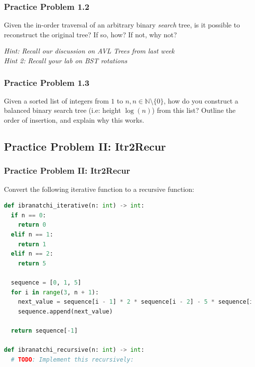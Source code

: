 \documentclass[hyperref={colorlinks,citecolor=blue,linkcolor=blue,urlcolor=blue}, aspectratio=1610]{beamer}
\begin{document}
\begin{frame}
  \frametitle{Practice Problem 1.2}
  Given the in-order traversal of an arbitrary binary \textit{search} tree, is it possible to reconstruct the original tree? If so, how? If not, why not?
  
  \textit{Hint: Recall our discussion on AVL Trees from last week}\\
  \textit{Hint 2: Recall your lab on BST rotations}

\end{frame}

\begin{frame}[fragile]
  \frametitle{Practice Problem 1.3}
  Given a sorted list of integers from $1$ to $n, n \in \mathbb{N} \setminus \{0\}$, how do you construct a balanced binary search tree (i.e: height $\log(n)$) from this list? Outline the order of insertion, and explain why this works.\\

\end{frame}

\subsection{Practice Problem II: Itr2Recur}
\begin{frame}[fragile]
  \frametitle{Practice Problem II: Itr2Recur}
  Convert the following iterative function to a recursive function:

  \begin{lstlisting}[language=Python, style=mystyle]
def ibranatchi_iterative(n: int) -> int:
  if n == 0:
    return 0
  elif n == 1:
    return 1
  elif n == 2:
    return 5

  sequence = [0, 1, 5]
  for i in range(3, n + 1):
    next_value = sequence[i - 1] * 2 * sequence[i - 2] - 5 * sequence[i - 3]
    sequence.append(next_value)

  return sequence[-1]
 
def ibranatchi_recursive(n: int) -> int:
  # TODO: Implement this recursively:

  \end{lstlisting}
\end{frame}
\end{document}
